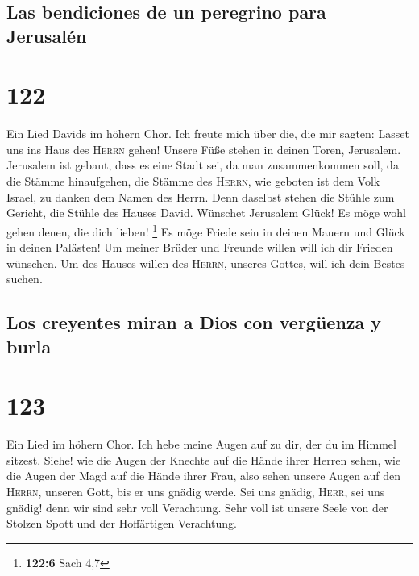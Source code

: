 \hypertarget{las-bendiciones-de-un-peregrino-para-jerusaluxe9n}{%
\subsection{Las bendiciones de un peregrino para
Jerusalén}\label{las-bendiciones-de-un-peregrino-para-jerusaluxe9n}}

\hypertarget{section-121}{%
\section{122}\label{section-121}}

 Ein Lied Davids im höhern Chor. Ich freute mich über die,
die mir sagten: Lasset uns ins Haus des \textsc{Herrn} gehen!
 Unsere Füße stehen in deinen Toren, Jerusalem.
 Jerusalem ist gebaut, dass es eine Stadt sei, da man
zusammenkommen soll,  da die Stämme hinaufgehen, die
Stämme des \textsc{Herrn}, wie geboten ist dem Volk Israel, zu danken
dem Namen des Herrn.  Denn daselbst stehen die Stühle zum
Gericht, die Stühle des Hauses David.  Wünschet Jerusalem
Glück! Es möge wohl gehen denen, die dich lieben! \footnote{\textbf{122:6}
  Sach 4,7}  Es möge Friede sein in deinen Mauern und
Glück in deinen Palästen!  Um meiner Brüder und Freunde
willen will ich dir Frieden wünschen.  Um des Hauses
willen des \textsc{Herrn}, unseres Gottes, will ich dein Bestes suchen.

\hypertarget{los-creyentes-miran-a-dios-con-verguxfcenza-y-burla}{%
\subsection{Los creyentes miran a Dios con vergüenza y
burla}\label{los-creyentes-miran-a-dios-con-verguxfcenza-y-burla}}

\hypertarget{section-122}{%
\section{123}\label{section-122}}

 Ein Lied im höhern Chor. Ich hebe meine Augen auf zu dir,
der du im Himmel sitzest.  Siehe! wie die Augen der
Knechte auf die Hände ihrer Herren sehen, wie die Augen der Magd auf die
Hände ihrer Frau, also sehen unsere Augen auf den \textsc{Herrn},
unseren Gott, bis er uns gnädig werde.  Sei uns gnädig,
\textsc{Herr}, sei uns gnädig! denn wir sind sehr voll Verachtung.
 Sehr voll ist unsere Seele von der Stolzen Spott und der
Hoffärtigen Verachtung.

